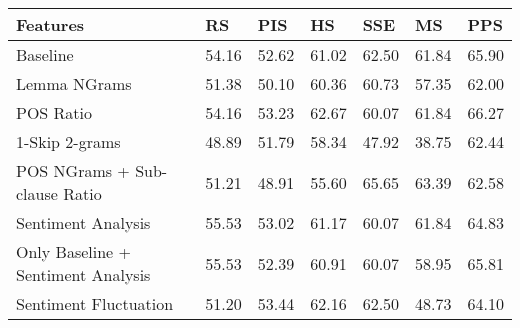 \begin{table}[h]
\centering
\begin{tabular}{|l|l|l|l|l|l|l|}
\hline
Features                           & RS                                                   & PIS                           & HS                            & SSE                           & MS                            & PPS                           \\ \hline
Baseline                           & 54.16                                                & 52.62                         & 61.02                         & 62.50                         & \cellcolor[HTML]{C0C0C0}61.84 & \cellcolor[HTML]{C0C0C0}65.90 \\ \hline
Lemma NGrams                       & 51.38                                                & 50.10                         & 60.36                         & 60.73                         & 57.35                         & 62.00                         \\ \hline
POS Ratio                          & 54.16                                                & \cellcolor[HTML]{C0C0C0}53.23 & \cellcolor[HTML]{656565}62.67 & 60.07                         & \cellcolor[HTML]{C0C0C0}61.84 & \cellcolor[HTML]{656565}66.27 \\ \hline
1-Skip 2-grams                     & 48.89                                                & 51.79                         & 58.34                         & 47.92                         & 38.75                         & 62.44                         \\ \hline
POS NGrams + Sub-clause Ratio      & 51.21                                                & 48.91                         & 55.60                         & \cellcolor[HTML]{C0C0C0}65.65 & \cellcolor[HTML]{656565}63.39 & 62.58                         \\ \hline
Sentiment Analysis                 & 55.53                                                & 53.02                         & 61.17                         & 60.07                         & \cellcolor[HTML]{C0C0C0}61.84 & 64.83                         \\ \hline
Only Baseline + Sentiment Analysis & 55.53                                                & 52.39                         & 60.91                         & 60.07                         & 58.95                         & 65.81                         \\ \hline
Sentiment Fluctuation              & 51.20                                                & \cellcolor[HTML]{656565}53.44 & 62.16                         & 62.50                         & 48.73                         & 64.10                         \\ \hline

\end{tabular}
\end{table}
